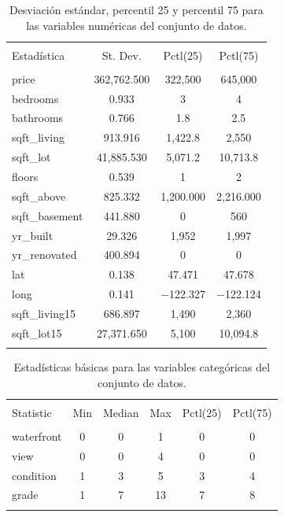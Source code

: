 \documentclass[10pt,letterpaper]{article}
\begin{document}
\begin{table}[!htbp] \centering 
	\small 
	\begin{tabular}{@{\extracolsep{5pt}}lccc} 
		\\[-1.8ex]\hline 
		\hline \\[-1.8ex] 
		Estadística & \multicolumn{1}{c}{St. Dev.} & \multicolumn{1}{c}{Pctl(25)} & \multicolumn{1}{c}{Pctl(75)} \\ 
		\hline \\[-1.8ex] 
		price & 362,762.500 & 322,500 & 645,000 \\ 
		bedrooms & 0.933 & 3 & 4 \\ 
		bathrooms & 0.766 & 1.8 & 2.5 \\ 
		sqft\_living & 913.916 & 1,422.8 & 2,550 \\ 
		sqft\_lot & 41,885.530 & 5,071.2 & 10,713.8 \\ 
		floors & 0.539 & 1 & 2 \\ 
		sqft\_above & 825.332 & 1,200.000 & 2,216.000 \\ 
		sqft\_basement & 441.880 & 0 & 560 \\ 
		yr\_built & 29.326 & 1,952 & 1,997 \\ 
		yr\_renovated & 400.894 & 0 & 0 \\ 
		lat & 0.138 & 47.471 & 47.678 \\ 
		long & 0.141 & $-$122.327 & $-$122.124 \\ 
		sqft\_living15 & 686.897 & 1,490 & 2,360 \\ 
		sqft\_lot15 & 27,371.650 & 5,100 & 10,094.8 \\ 
		\hline \\[-1.8ex] 
	\end{tabular} 
	\caption{Desviación estándar, percentil 25 y percentil 75 para las variables numéricas del conjunto de datos.} 
	\label{tab:res02} 
\end{table} 

\begin{table}[!htbp] \centering 
	\small 
	\begin{tabular}{@{\extracolsep{5pt}}lccccc} 
		\\[-1.8ex]\hline 
		\hline \\[-1.8ex] 
		Statistic & \multicolumn{1}{c}{Min} & \multicolumn{1}{c}{Median} & \multicolumn{1}{c}{Max} & \multicolumn{1}{c}{Pctl(25)} & \multicolumn{1}{c}{Pctl(75)} \\ 
		\hline \\[-1.8ex] 
		waterfront & 0 & 0 & 1 & 0 & 0 \\ 
		view & 0 & 0 & 4 & 0 & 0 \\ 
		condition & 1 & 3 & 5 & 3 & 4 \\ 
		grade & 1 & 7 & 13 & 7 & 8 \\ 
		\hline \\[-1.8ex] 
	\end{tabular} 
	\caption{Estadísticas básicas para las variables categóricas del conjunto de datos.} 
	\label{tab:res03} 
\end{table} 
\end{document}
